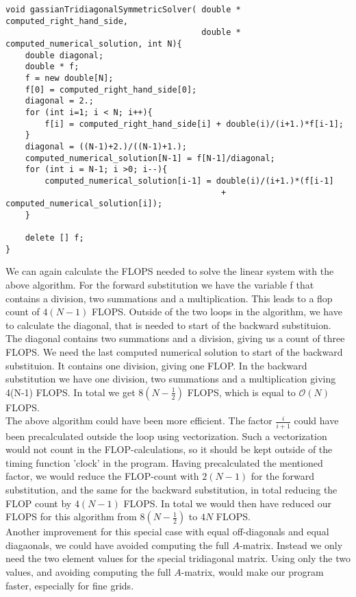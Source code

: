 \documentclass{article}
\begin{document}
\begin{lstlisting}
void gassianTridiagonalSymmetricSolver( double * computed_right_hand_side, 
										double * computed_numerical_solution, int N){
    double diagonal;
    double * f;
    f = new double[N];
    f[0] = computed_right_hand_side[0];
    diagonal = 2.;
    for (int i=1; i < N; i++){
        f[i] = computed_right_hand_side[i] + double(i)/(i+1.)*f[i-1];
    }
    diagonal = ((N-1)+2.)/((N-1)+1.);
    computed_numerical_solution[N-1] = f[N-1]/diagonal;
    for (int i = N-1; i >0; i--){
        computed_numerical_solution[i-1] = double(i)/(i+1.)*(f[i-1] 
        									+ computed_numerical_solution[i]);
    }

    delete [] f;
}
\end{lstlisting}

We can again calculate the FLOPS needed to solve the linear system with the above algorithm. For the forward substitution we have the variable f that contains a division, two summations and a multiplication. This leads to a flop count of $4(N-1)$ FLOPS. Outside of the two loops in the algorithm, we have to calculate the diagonal, that is needed to start of the backward substituion. The diagonal contains two summations and a division, giving us a count of three FLOPS. We need the last computed numerical solution to start of the backward substituion. It contains one division, giving one FLOP. In the backward substitution we have one division, two summations and a multiplication giving 4(N-1) FLOPS. In total we get $8(N-\frac{1}{2})$ FLOPS, which is equal to $\mathcal{O}(N)$ FLOPS.\\

The above algorithm could have been more efficient. The factor $\frac{i}{i+1}$ could have been precalculated outside the loop using vectorization. Such a vectorization would not count in the FLOP-calculations, so it should be kept outside of the timing function 'clock' in the program. Having precalculated the mentioned factor, we would reduce the FLOP-count with $2(N-1)$ for the forward substitution, and the same for the backward substitution, in total reducing the FLOP count by $4(N-1)$ FLOPS. In total we would then have reduced our FLOPS for this algorithm from $8(N-\frac{1}{2})$ to $4N$ FLOPS.\\

Another improvement for this special case with equal off-diagonals and equal diagaonals, we could have avoided computing the full $A$-matrix. Instead we only need the two element values for the special tridiagonal matrix. Using only the two values, and avoiding computing the full $A$-matrix, would make our program faster, especially for fine grids.
\end{document}
